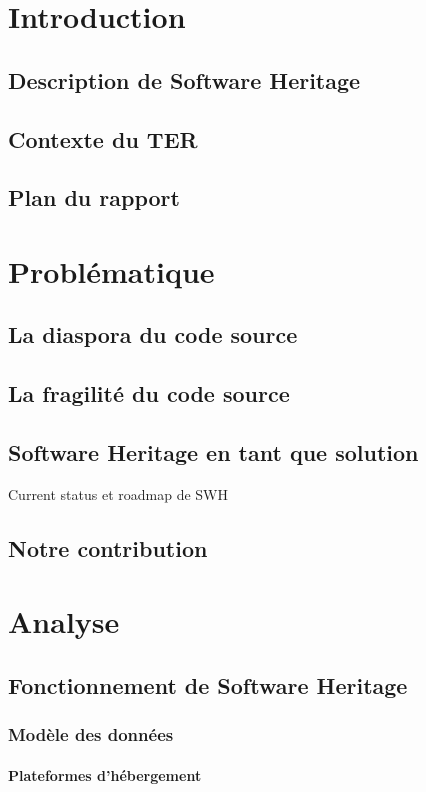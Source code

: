 \documentclass[12pt,a4paper]{report}
\begin{document}
\chapter{Introduction}
	\section{Description de Software Heritage}
	\section{Contexte du TER}
	\section{Plan du rapport}

\chapter{Problématique}
\section{La diaspora du code source}
\section{La fragilité du code source}
\section{Software Heritage en tant que solution}
	Current status et roadmap de SWH
\section{Notre contribution}

\chapter{Analyse}
\section{Fonctionnement de Software Heritage}
	\subsection{Modèle des données}
		\subsubsection{Plateformes d'hébergement}
\end{document}
